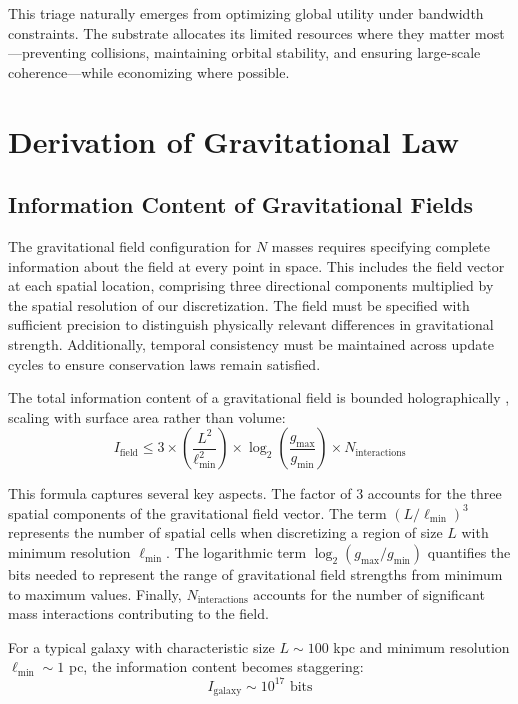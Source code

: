 \documentclass[twocolumn,prd,amsmath,amssymb,aps,superscriptaddress,nofootinbib]{revtex4-2}
\begin{document}
This triage naturally emerges from optimizing global utility under bandwidth constraints. The substrate allocates its limited resources where they matter most---preventing collisions, maintaining orbital stability, and ensuring large-scale coherence---while economizing where possible.

\section{Derivation of Gravitational Law}
\label{sec:derivation}

\subsection{Information Content of Gravitational Fields}

The gravitational field configuration for $N$ masses requires specifying complete information about the field at every point in space. This includes the field vector at each spatial location, comprising three directional components multiplied by the spatial resolution of our discretization. The field must be specified with sufficient precision to distinguish physically relevant differences in gravitational strength. Additionally, temporal consistency must be maintained across update cycles to ensure conservation laws remain satisfied.

The total information content of a gravitational field is bounded holographically \cite{Bekenstein1973, tHooft1993}, scaling with surface area rather than volume:
\begin{equation}
I_{\text{field}} \leq 3 \times \left(\frac{L^2}{\ell_{\text{min}}^2}\right) \times \log_2\left(\frac{g_{\text{max}}}{g_{\text{min}}}\right) \times N_{\text{interactions}}
\end{equation}

This formula captures several key aspects. The factor of 3 accounts for the three spatial components of the gravitational field vector. The term $(L/\ell_{\text{min}})^3$ represents the number of spatial cells when discretizing a region of size $L$ with minimum resolution $\ell_{\text{min}}$. The logarithmic term $\log_2(g_{\text{max}}/g_{\text{min}})$ quantifies the bits needed to represent the range of gravitational field strengths from minimum to maximum values. Finally, $N_{\text{interactions}}$ accounts for the number of significant mass interactions contributing to the field.

For a typical galaxy with characteristic size $L \sim 100$ kpc and minimum resolution $\ell_{\text{min}} \sim 1$ pc, the information content becomes staggering:
\begin{equation}
I_{\text{galaxy}} \sim 10^{17} \text{ bits}
\end{equation}
\end{document}
